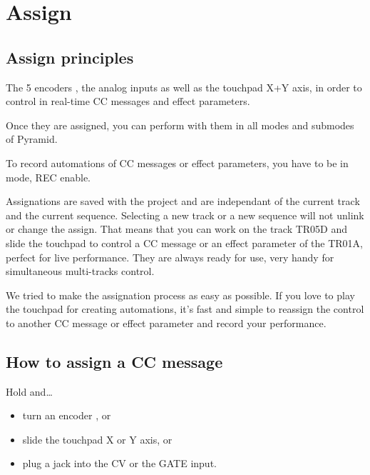 \chapter{Assign}

\section{Assign principles}

The 5 encoders \encodersicon{}, the analog inputs as well as the touchpad \touchpadicon{} X+Y axis, in order to control in real-time CC messages and effect parameters.

Once they are assigned, you can perform with them in all modes and submodes of Pyramid.

To record automations of CC messages or effect parameters, you have to be in  mode, REC enable.

Assignations are saved with the project and are independant of the current track and the current sequence. Selecting a new track or a new sequence will not unlink or change the assign. That means that you can work on the track TR05D and slide the touchpad to control a CC message or an effect parameter of the TR01A, perfect for live performance. They are always ready for use, very handy for simultaneous multi-tracks control.

We tried to make the assignation process as easy as possible. If you love to play the touchpad for creating automations, it's fast and simple to reassign the control to another CC message or effect parameter and record your performance.




\section{How to assign a CC message}

Hold  and\ldots

\begin{itemize}
\item turn an encoder \encodersicon{}, or
\item slide the touchpad \touchpadicon{} X or Y axis, or
\item plug a jack into the CV or the GATE input.
\end{itemize}

